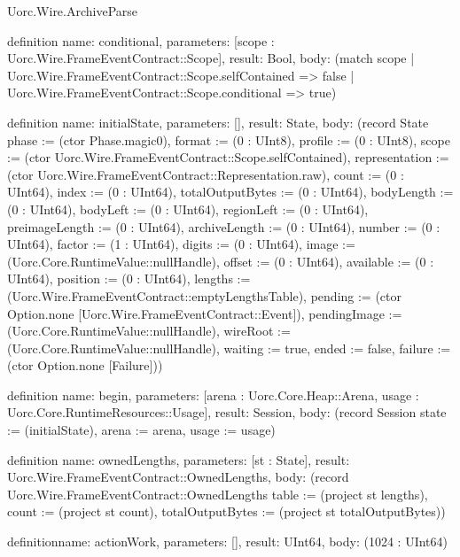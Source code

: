 \begin{lexlean}{Uorc.Wire.ArchiveParse}
\begin{semanticmodule}
definition{
  name: conditional,
  parameters: [scope : Uorc.Wire.FrameEventContract::Scope],
  result: Bool,
  body: (match scope
    | Uorc.Wire.FrameEventContract::Scope.selfContained => false
    | Uorc.Wire.FrameEventContract::Scope.conditional => true)
}

definition{
  name: initialState,
  parameters: [],
  result: State,
  body: (record State {phase := (ctor Phase.magic0), format := (0 : UInt8), profile := (0 : UInt8), scope := (ctor Uorc.Wire.FrameEventContract::Scope.selfContained), representation := (ctor Uorc.Wire.FrameEventContract::Representation.raw), count := (0 : UInt64), index := (0 : UInt64), totalOutputBytes := (0 : UInt64), bodyLength := (0 : UInt64), bodyLeft := (0 : UInt64), regionLeft := (0 : UInt64), preimageLength := (0 : UInt64), archiveLength := (0 : UInt64), number := (0 : UInt64), factor := (1 : UInt64), digits := (0 : UInt64), image := (Uorc.Core.RuntimeValue::nullHandle), offset := (0 : UInt64), available := (0 : UInt64), position := (0 : UInt64), lengths := (Uorc.Wire.FrameEventContract::emptyLengthsTable), pending := (ctor Option.none [Uorc.Wire.FrameEventContract::Event]), pendingImage := (Uorc.Core.RuntimeValue::nullHandle), wireRoot := (Uorc.Core.RuntimeValue::nullHandle), waiting := true, ended := false, failure := (ctor Option.none [Failure])})
}

definition{
  name: begin,
  parameters: [arena : Uorc.Core.Heap::Arena, usage : Uorc.Core.RuntimeResources::Usage],
  result: Session,
  body: (record Session {state := (initialState), arena := arena, usage := usage})
}

definition{
  name: ownedLengths,
  parameters: [st : State],
  result: Uorc.Wire.FrameEventContract::OwnedLengths,
  body: (record Uorc.Wire.FrameEventContract::OwnedLengths {table := (project st lengths), count := (project st count), totalOutputBytes := (project st totalOutputBytes)})
}

definition{name: actionWork, parameters: [], result: UInt64, body: (1024 : UInt64)}


\end{semanticmodule}
\end{lexlean}
